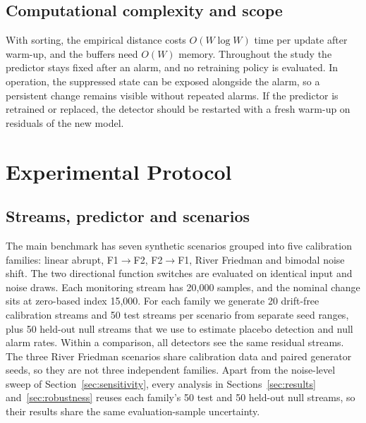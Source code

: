 \documentclass[preprint,12pt]{elsarticle}
\begin{document}
\subsection{Computational complexity and scope}
With sorting, the empirical distance costs $O(W\log W)$ time per update after warm-up, and the buffers need $O(W)$ memory. Throughout the study the predictor stays fixed after an alarm, and no retraining policy is evaluated. In operation, the suppressed state can be exposed alongside the alarm, so a persistent change remains visible without repeated alarms. If the predictor is retrained or replaced, the detector should be restarted with a fresh warm-up on residuals of the new model.

\section{Experimental Protocol}
\label{sec:validation}
\subsection{Streams, predictor and scenarios}
\label{sec:scenarios}
The main benchmark has seven synthetic scenarios grouped into five calibration families: linear abrupt, F1$\to$F2, F2$\to$F1, River Friedman and bimodal noise shift. The two directional function switches are evaluated on identical input and noise draws. Each monitoring stream has 20,000 samples, and the nominal change sits at zero-based index 15,000. For each family we generate 20 drift-free calibration streams and 50 test streams per scenario from separate seed ranges, plus 50 held-out null streams that we use to estimate placebo detection and null alarm rates. Within a comparison, all detectors see the same residual streams. The three River Friedman scenarios share calibration data and paired generator seeds, so they are not three independent families. Apart from the noise-level sweep of Section~\ref{sec:sensitivity}, every analysis in Sections~\ref{sec:results} and~\ref{sec:robustness} reuses each family's 50 test and 50 held-out null streams, so their results share the same evaluation-sample uncertainty.
\end{document}
